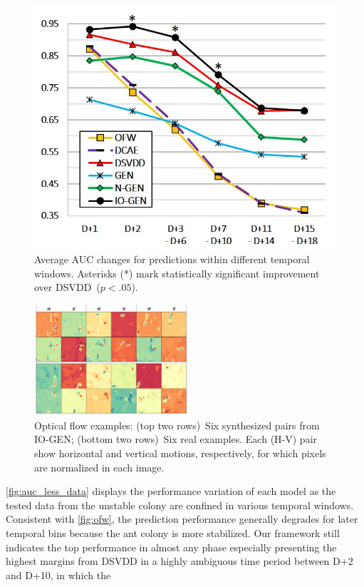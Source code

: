 \documentclass[letterpaper]{article} %
\let\orgautoref\autoref
\providecommand{\Autoref}
{\def\equationautorefname{Equation}%
\def\figureautorefname{Figure}%
\def\subfigureautorefname{Figure}%
\def\Itemautorefname{Item}%
\def\tableautorefname{Table}%
\def\exerciseautorefname{Exercise}%
\def\starexerciseautorefname{Exercise}%
\def\sectionautorefname{Section}%
\def\subsectionautorefname{Section}%
\def\subsubsectionautorefname{Section}%
\def\chapterautorefname{Section}%
\def\partautorefname{Part}%
\orgautoref}
\renewcommand{\autoref}
{\def\equationautorefname{Equation}%
\def\figureautorefname{Fig.}%
\def\subfigureautorefname{Fig.}%
\def\Itemautorefname{item}%
\def\tableautorefname{Table}%
\def\exerciseautorefname{Exercise}%
\def\starexerciseautorefname{Exercise}%
\def\sectionautorefname{Section}%
\def\subsectionautorefname{Section}%
\def\subsubsectionautorefname{Section}%
\def\chapterautorefname{Section}%
\def\partautorefname{Part}%
\orgautoref}
\begin{document}
\begin{figure}[t]
\centering
\includegraphics[width=.75\columnwidth]{auc_less_data}
\caption{
Average AUC changes for predictions within different temporal
windows.
Asterisks (*) mark statistically significant improvement over
DSVDD~($p<.05$).
}
\label{fig:auc_less_data}
\end{figure}
\vspace{-1.05mm}
\vspace{-2.10mm}
\begin{figure}\centering
\includegraphics[width=.75\linewidth,height=1.62in ]{real_fake_flows}
\caption{Optical flow examples:
(top two rows)~Six synthesized pairs from \mbox{IO-GEN};
(bottom two rows)~Six real examples.
Each (H-V) pair show horizontal and vertical motions,
respectively, for which pixels are normalized in each image.
}
\label{fig:real_fake_flows}
\end{figure}
\Autoref{fig:auc_less_data} displays the performance variation of each
model as the tested data from the unstable colony are confined in
various temporal windows.
Consistent with \autoref{fig:ofw}, the prediction performance
generally degrades for later temporal bins because the ant colony is
more stabilized. Our framework still indicates the top performance in
almost any phase especially presenting the highest margins from DSVDD
in a highly ambiguous time period between D+2 and D+10, in which the
\end{document}
